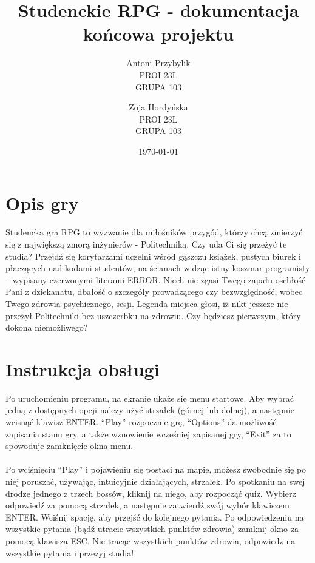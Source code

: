 \documentclass[12pt, titlepage]{article}
\author{Antoni Przybylik \\ PROI 23L \\ GRUPA 103 \and
	Zoja Hordyńska \\ PROI 23L \\ GRUPA 103}
\date{\today}
\title{Studenckie RPG - dokumentacja końcowa projektu}
\begin{document}
\maketitle
\justifying



\hypersetup{
	colorlinks=true,
	linkcolor=blue,
}

\lstset{style=listingstyle}

\section{Opis gry}
Studencka gra RPG to wyzwanie dla miłośników przygód, którzy chcą zmierzyć się z największą zmorą inżynierów - Politechniką. Czy uda Ci się przeżyć te studia? Przejdź się korytarzami uczelni wśród gąszczu książek, pustych biurek i płaczących nad kodami studentów, na ścianach widząc istny koszmar programisty – wypisany czerwonymi literami ERROR. Niech nie zgasi Twego zapału oschłość Pani z dziekanatu, dbałość o szczegóły prowadzącego czy bezwzględność, wobec Twego zdrowia psychicznego, sesji. Legenda miejsca głosi, iż nikt jeszcze nie przeżył Politechniki bez uszczerbku na zdrowiu. Czy będziesz pierwszym, który dokona niemożliwego? 

\section{Instrukcja obsługi}
Po uruchomieniu programu, na ekranie ukaże się menu startowe. Aby wybrać jedną z dostępnych opcji należy użyć strzałek (górnej lub dolnej), a następnie wcisnąć klawisz ENTER. “Play” rozpocznie grę, “Options” da możliwość zapisania stanu gry, a także wznowienie wcześniej zapisanej gry, “Exit” za to spowoduje zamknięcie okna menu.  
\\~\\
Po wciśnięciu “Play” i pojawieniu się postaci na mapie, możesz swobodnie się po niej poruszać, używając, intuicyjnie działających, strzałek. Po spotkaniu na swej drodze jednego z trzech bossów, kliknij na niego, aby rozpocząć quiz. Wybierz odpowiedź za pomocą strzałek, a następnie zatwierdź swój wybór klawiszem ENTER. Wciśnij spację, aby przejść do kolejnego pytania. Po odpowiedzeniu na wszystkie pytania (bądź utracie wszystkich punktów zdrowia) zamknij okno za pomocą klawisza ESC. Nie tracąc wszystkich punktów zdrowia, odpowiedz na wszystkie pytania i przeżyj studia! 
\end{document}
